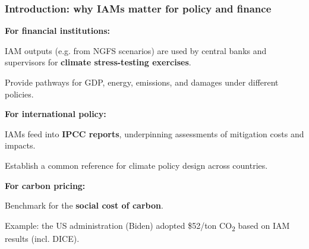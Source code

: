 \documentclass[xcolor=x11names,compress,aspectratio=169]{beamer}%
\makeatletter
\renewenvironment{itemize}{\begin{compactitemize}[<+-| alert@+>]}{\end{compactitemize}}
\makeatother
\begin{document}
\begin{frame}%
%

\frametitle{Introduction: why IAMs matter for policy and finance}%


\begin{itemize}
\item \textbf{For financial institutions:}

\begin{itemize}
\item IAM outputs (e.g. from NGFS scenarios) are used by central banks and
supervisors for \textbf{climate stress-testing exercises}.

\item Provide pathways for GDP, energy, emissions, and damages under different policies.
\end{itemize}

\item \textbf{For international policy:}

\begin{itemize}
\item IAMs feed into \textbf{IPCC reports}, underpinning assessments of
mitigation costs and impacts.

\item Establish a common reference for climate policy design across countries.
\end{itemize}

\item \textbf{For carbon pricing:}

\begin{itemize}
\item Benchmark for the \textbf{social cost of carbon}.

\item Example: the US administration (Biden) adopted \$52/ton
CO\textsubscript{2} based on IAM results (incl. DICE).
\end{itemize}
\end{itemize}

%

\transboxout
\end{frame}%
%
\end{document}
